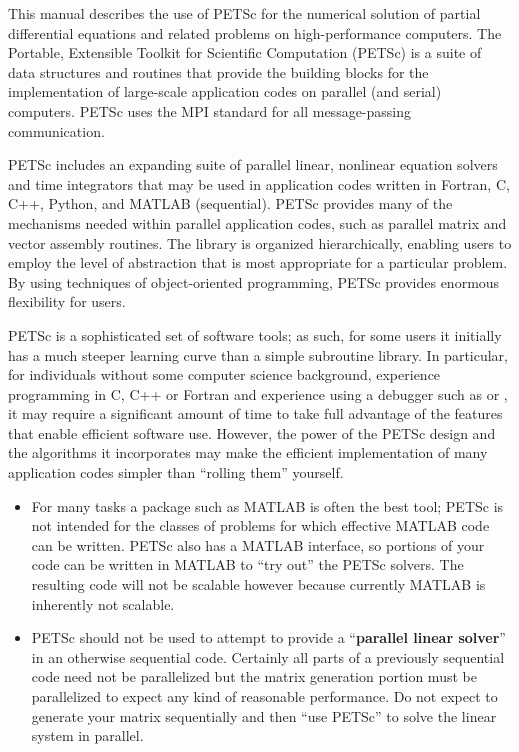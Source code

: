 
%
%

\medskip \medskip
This manual describes the use of PETSc for the numerical solution
of partial differential equations and related problems 
on high-performance computers.  The
Portable, Extensible Toolkit for Scientific Computation (PETSc) is a
suite of data structures and routines that provide the building
blocks for the implementation of large-scale application codes on parallel
(and serial) computers.  PETSc uses the MPI standard for all
message-passing communication.

PETSc includes an expanding suite of parallel linear, nonlinear
equation solvers and time integrators that may be
used in application codes written in Fortran, C, C++, Python, and MATLAB (sequential).  PETSc
provides many of the mechanisms needed within parallel application
codes, such as parallel matrix and vector assembly routines. The library is
organized hierarchically, enabling users to employ the level of
abstraction that is most appropriate for a particular problem. By
using techniques of object-oriented programming, PETSc provides
enormous flexibility for users.

PETSc is a sophisticated set of software tools; as such, for some
users it initially has a much steeper learning curve than a simple
subroutine library. In particular, for individuals without some
computer science background, experience programming in C, C++ or Fortran and experience using a debugger such as  or , it
may require a significant amount of time to take full advantage of the
features that enable efficient software use.  However, the power of
the PETSc design and the algorithms it incorporates may make the efficient
implementation of many application codes simpler than ``rolling
them'' yourself.
\begin{itemize}
\item  For many tasks a package such as MATLAB is often the best tool; PETSc is not
intended for the classes of problems for which effective MATLAB code
can be written. PETSc also has a MATLAB interface, so portions of your code can be written in MATLAB to ``try out'' the PETSc solvers. 
The resulting code will not be scalable however because currently MATLAB is inherently not scalable.
\item PETSc should not be used to attempt to provide
a ``{\bf parallel linear solver}'' in an otherwise sequential code.
Certainly all parts of a previously sequential code need not be parallelized but the 
matrix generation portion must be parallelized to expect any kind of reasonable performance.
Do not expect to generate your matrix sequentially and then ``use PETSc'' to solve
the linear system in parallel.
\end{itemize}

